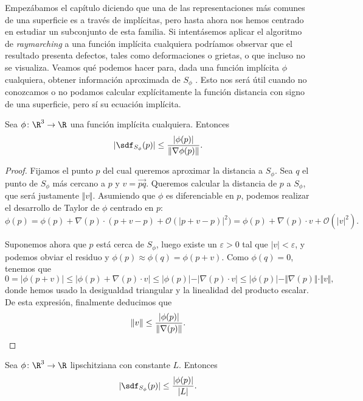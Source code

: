 Empezábamos el capítulo diciendo que una de las representaciones más comunes de una superficie es a través de implícitas, pero hasta ahora nos hemos centrado en estudiar un subconjunto de esta familia. Si intentásemos aplicar el algoritmo de \textit{raymarching} a una función implícita cualquiera podríamos observar que el resultado presenta defectos, tales como deformaciones o grietas, o que incluso no se visualiza. Veamos qué podemos hacer para, dada una función implícita $\phi$ cualquiera, obtener información aproximada de $S_\phi$ \cite{article:aprox}. Esto nos será útil cuando no conozcamos o no podamos calcular explícitamente la función distancia con signo de una superficie, pero sí su ecuación implícita.

\begin{proposicion}
    Sea $\phi\colon \R^3\to\R$ una función implícita cualquiera. Entonces
    \begin{equation*}    
        \vert \sdf_{S_\phi}(p)\vert \le \frac{\vert \phi(p)\vert}{\Vert \nabla\phi(p)\Vert}.
    \end{equation*}
\end{proposicion}
\begin{proof}
    Fijamos el punto $p$ del cual queremos aproximar la distancia a $S_{\phi}$. Sea $q$ el punto de $S_\phi$ más cercano a $p$ y $v=\vec{pq}$. Queremos calcular la distancia de $p$ a $S_\phi$, que será justamente $\Vert v\Vert$. Asumiendo que $\phi$ es diferenciable en $p$, podemos realizar el desarrollo de Taylor de $\phi$ centrado en $p$:
    \begin{equation*}
        \phi(p) = \phi(p) + \nabla(p)\cdot (p+v -p) + \mathcal{O}(\vert p+v-p)\vert^2) = \phi(p) + \nabla(p)\cdot v + \mathcal{O}(\vert v\vert^2).
    \end{equation*}

    Suponemos ahora que $p$ está cerca de $S_\phi$, luego existe un $\varepsilon>0$ tal que  $\vert v\vert < \varepsilon$, y podemos obviar el residuo y $\phi(p)\approx \phi(q) = \phi(p+v)$. Como $\phi(q)=0$, tenemos que
    \begin{equation*}
        0 = \vert \phi(p+v)\vert \le \vert \phi(p) + \nabla(p)\cdot v \vert \le \vert \phi(p)\vert - \vert \nabla(p)\cdot v \vert         \le \vert \phi(p)\vert - \Vert \nabla(p)\Vert\cdot \Vert v \Vert,
    \end{equation*}
    donde hemos usado la desigualdad triangular y la linealidad del producto escalar. De esta expresión, finalmente deducimos que
    \begin{equation*}
        \Vert v\Vert \le \frac{\vert \phi(p)\vert}{\Vert \nabla(p)\Vert}.\qedhere
    \end{equation*}
\end{proof}
\begin{corolario}
    Sea $\phi\colon \R^3\to \R$ lipschitziana con constante $L$. Entonces
    \begin{equation*}    
        \vert \sdf_{S_\phi}(p)\vert \le \frac{\vert \phi(p)\vert}{\vert L\vert}.
    \end{equation*}
\end{corolario}

